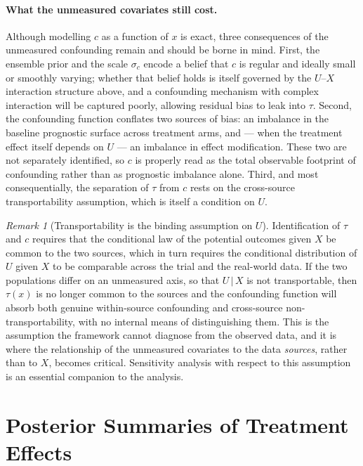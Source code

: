 \documentclass[11pt]{report}
\theoremstyle{plain}
\theoremstyle{definition}
\theoremstyle{remark}
\newcommand{\1}{\mathds{1}}
\theoremstyle{plain}
\theoremstyle{remark}
\newtheorem{remark}[theorem]{Remark}
\newcommand{\given}{\,\vert\,}
\begin{document}
\paragraph{What the unmeasured covariates still cost.}
Although modelling $c$ as a function of $x$ is exact, three consequences of the
unmeasured confounding remain and should be borne in mind. First, the ensemble
prior and the scale $\sigma_c$ encode a belief that $c$ is regular and ideally
small or smoothly varying; whether that belief holds is itself governed by the
$U$--$X$ interaction structure above, and a confounding mechanism with complex
interaction will be captured poorly, allowing residual bias to leak into $\tau$.
Second, the confounding function conflates two sources of bias: an imbalance in
the baseline prognostic surface across treatment arms, and --- when the
treatment effect itself depends on $U$ --- an imbalance in effect modification.
These two are not separately identified, so $c$ is properly read as the total
observable footprint of confounding rather than as prognostic imbalance alone.
Third, and most consequentially, the separation of $\tau$ from $c$ rests on the
cross-source transportability assumption, which is itself a condition on $U$.

\begin{remark}[Transportability is the binding assumption on $U$]
\label{rem:transport-U}
Identification of $\tau$ and $c$ requires that the conditional law of the
potential outcomes given $X$ be common to the two sources, which in turn
requires the conditional distribution of $U$ given $X$ to be comparable across
the trial and the real-world data. If the two populations differ on an
unmeasured axis, so that $U \given X$ is not transportable, then $\tau(x)$ is no
longer common to the sources and the confounding function will absorb both
genuine within-source confounding and cross-source non-transportability, with no
internal means of distinguishing them. This is the assumption the framework
cannot diagnose from the observed data, and it is where the relationship of the
unmeasured covariates to the data \emph{sources}, rather than to $X$, becomes
critical. Sensitivity analysis with respect to this assumption is an essential
companion to the analysis.
\end{remark}

\section{Posterior Summaries of Treatment Effects}
\label{sec:pi-summaries}
\end{document}
